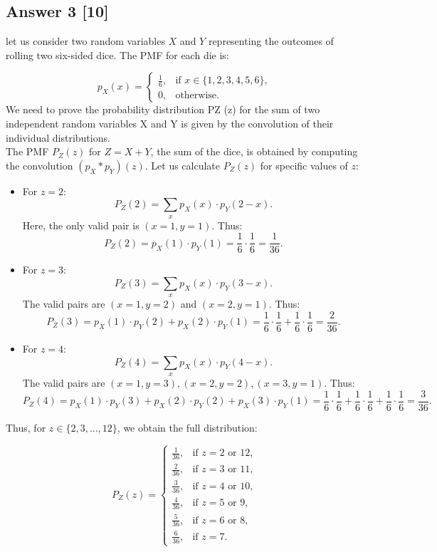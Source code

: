 \documentclass[12pt]{article}
\begin{document}
\subsection*{Answer 3 [10]}
let us consider two random variables \( X \) and \( Y \) representing the outcomes of rolling two six-sided dice. The PMF for each die is:

\[
p_X(x) =
\begin{cases}
\frac{1}{6}, & \text{if } x \in \{1, 2, 3, 4, 5, 6\}, \\
0, & \text{otherwise}.
\end{cases}
\]
We need to prove the probability distribution PZ (z) for the sum of two independent
random variables X and Y is given by the convolution of their individual
distributions.\\
The PMF \( P_Z(z) \) for \( Z = X + Y \), the sum of the dice, is obtained by computing the convolution \( (p_X * p_Y)(z) \). Let us calculate \( P_Z(z) \) for specific values of \( z \):

\begin{itemize}
    \item For \( z = 2 \):
    \[
    P_Z(2) = \sum_{x} p_X(x) \cdot p_Y(2 - x).
    \]
    Here, the only valid pair is \( (x = 1, y = 1) \). Thus:
    \[
    P_Z(2) = p_X(1) \cdot p_Y(1) = \frac{1}{6} \cdot \frac{1}{6} = \frac{1}{36}.
    \]

    \item For \( z = 3 \):
    \[
    P_Z(3) = \sum_{x} p_X(x) \cdot p_Y(3 - x).
    \]
    The valid pairs are \( (x = 1, y = 2) \) and \( (x = 2, y = 1) \). Thus:
    \[
    P_Z(3) = p_X(1) \cdot p_Y(2) + p_X(2) \cdot p_Y(1) = \frac{1}{6} \cdot \frac{1}{6} + \frac{1}{6} \cdot \frac{1}{6} = \frac{2}{36}.
    \]

    \item For \( z = 4 \):
    \[
    P_Z(4) = \sum_{x} p_X(x) \cdot p_Y(4 - x).
    \]
    The valid pairs are \( (x = 1, y = 3), (x = 2, y = 2), (x = 3, y = 1) \). Thus:
    \[
    P_Z(4) = p_X(1) \cdot p_Y(3) + p_X(2) \cdot p_Y(2) + p_X(3) \cdot p_Y(1) = \frac{1}{6} \cdot \frac{1}{6} + \frac{1}{6} \cdot \frac{1}{6} + \frac{1}{6} \cdot \frac{1}{6} = \frac{3}{36}.
    \]
\end{itemize}

Thus, for \( z \in \{2, 3, \dots, 12\} \), we obtain the full distribution:

\[
P_Z(z) =
\begin{cases}
\frac{1}{36}, & \text{if } z = 2 \text{ or } 12, \\
\frac{2}{36}, & \text{if } z = 3 \text{ or } 11, \\
\frac{3}{36}, & \text{if } z = 4 \text{ or } 10, \\
\frac{4}{36}, & \text{if } z = 5 \text{ or } 9, \\
\frac{5}{36}, & \text{if } z = 6 \text{ or } 8, \\
\frac{6}{36}, & \text{if } z = 7.
\end{cases}
\]
\end{document}
